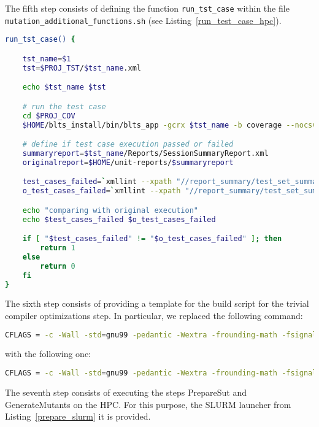 The fifth step consists of defining the function \texttt{run\_tst\_case} within the file \\\texttt{mutation\_additional\_functions.sh} (see Listing~\ref{run_test_case_hpc}).

\begin{lstlisting}[language=bash, label=run_test_case_hpc ,caption=Implementation of the run test case Bash function for the MLFS.]
run_tst_case() {

    tst_name=$1
    tst=$PROJ_TST/$tst_name.xml

    echo $tst_name $tst

    # run the test case
    cd $PROJ_COV
    $HOME/blts_install/bin/blts_app -gcrx $tst_name -b coverage --nocsv -s $tst

    # define if test case execution passed or failed
    summaryreport=$tst_name/Reports/SessionSummaryReport.xml
    originalreport=$HOME/unit-reports/$summaryreport

    test_cases_failed=`xmllint --xpath "//report_summary/test_set_summary/test_cases_failed/text()" $summaryreport`
    o_test_cases_failed=`xmllint --xpath "//report_summary/test_set_summary/test_cases_failed/text()" $originalreport`

    echo "comparing with original execution" 
    echo $test_cases_failed $o_test_cases_failed 

    if [ "$test_cases_failed" != "$o_test_cases_failed" ]; then
        return 1
    else
        return 0
    fi
}
\end{lstlisting}

The sixth step consists of providing a template for the build script for the trivial compiler optimizations step. In particular, we replaced the following command: 

\begin{lstlisting}[language=bash]
CFLAGS = -c -Wall -std=gnu99 -pedantic -Wextra -frounding-math -fsignaling-nans -g O2 -fno-builtin $(EXTRA_CFLAGS)
\end{lstlisting}

with the following one:

\begin{lstlisting}[language=bash]
CFLAGS = -c -Wall -std=gnu99 -pedantic -Wextra -frounding-math -fsignaling-nans TCE -fno-builtin $(EXTRA_CFLAGS)
\end{lstlisting}

The seventh step consists of executing the steps PrepareSut and GenerateMutants on the HPC. For this purpose, the SLURM launcher from Listing~\ref{prepare_slurm} it is provided.

